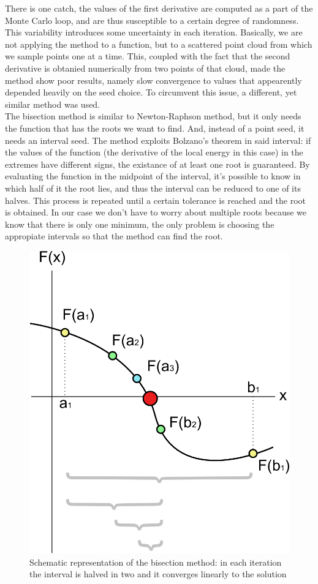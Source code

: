 		There is one catch, the values of the first derivative are computed as a part of the Monte Carlo loop, and are thus susceptible to a certain degree of randomness. This variability introduces some uncertainty in each iteration. Basically, we are not applying the method to a function, but to a scattered point cloud from which we sample points one at a time. This, coupled with the fact that the second derivative is obtanied numerically from two points of that cloud, made the method show poor results, namely slow convergence to values that appearently depended heavily on the seed choice. To circumvent this issue, a different, yet similar method was used.\\

		The bisection method is similar to Newton-Raphson method, but it only needs the function that has the roots we want to find. And, instead of a point seed, it needs an interval seed. The method exploits Bolzano's theorem in said interval: if the values of the function (the derivative of the local energy in this case) in the extremes have different signs, the existance of at least one root is guaranteed. By evaluating the function in the midpoint of the interval, it's possible to know in which half of it the root lies, and thus the interval can be reduced to one of its halves. This process is repeated until a certain tolerance is reached and the root is obtained. In our case we don't have to worry about multiple roots because we know that there is only one minimum, the only problem is choosing the appropiate intervals so that the method can find the root.\\

		\begin{figure}
			\centering \includegraphics[width=0.45\linewidth]{../figures/Bisection_method}
			\protect\caption{Schematic representation of the bisection method: in each iteration the interval is halved in two and it converges linearly to the solution}
		\end{figure}


